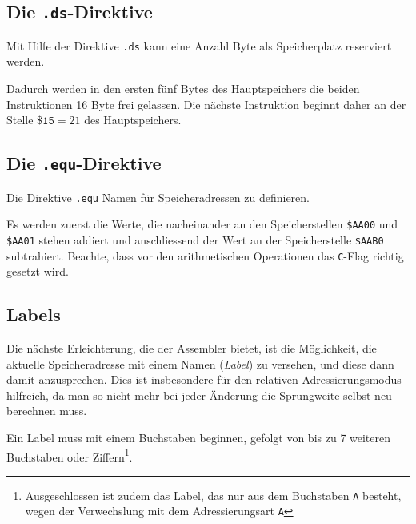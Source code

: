 \documentclass[11pt]{scrartcl}
\newcommand{\acc}{\texttt{A}}
\newcommand{\hex}[1]{\texttt{\$#1}}
\begin{document}
\subsection{Die \lstinline!.ds!-Direktive}
\label{sec:ds_directive}

Mit Hilfe der Direktive \lstinline!.ds! kann eine Anzahl Byte als
Speicherplatz reserviert werden.

\begin{center}
  
\end{center}

Dadurch werden in den ersten fünf Bytes des Hauptspeichers die beiden
Instruktionen 16 Byte frei gelassen. Die nächste Instruktion beginnt
daher an der Stelle $\hex{15}=21$ des Hauptspeichers.


\subsection{Die \lstinline!.equ!-Direktive}
\label{sec:equ_directive}

Die Direktive \lstinline!.equ! Namen für Speicheradressen zu
definieren.

\begin{center}
  
\end{center}

Es werden zuerst die Werte, die nacheinander an den Speicherstellen
\hex{AA00} und \hex{AA01} stehen addiert und anschliessend der Wert an
der Speicherstelle \hex{AAB0} subtrahiert. Beachte, dass vor den
arithmetischen Operationen das \lstinline|C|-Flag richtig gesetzt
wird.




\subsection{Labels}
\label{sec:ass_labels}

Die nächste Erleichterung, die der Assembler bietet, ist die
Möglichkeit, die aktuelle Speicheradresse mit einem Namen
(\emph{Label}) zu versehen, und diese dann damit anzusprechen.
Dies ist insbesondere für den relativen Adressierungsmodus hilfreich,
da man so nicht mehr bei jeder Änderung die Sprungweite selbst neu
berechnen muss. 

Ein Label muss mit einem Buchstaben beginnen, gefolgt von bis zu 7
weiteren Buchstaben oder Ziffern\footnote{Ausgeschlossen ist zudem das
  Label, das nur aus dem Buchstaben \lstinline!A! besteht, wegen der
  Verwechslung mit dem Adressierungsart \acc}.
\end{document}
